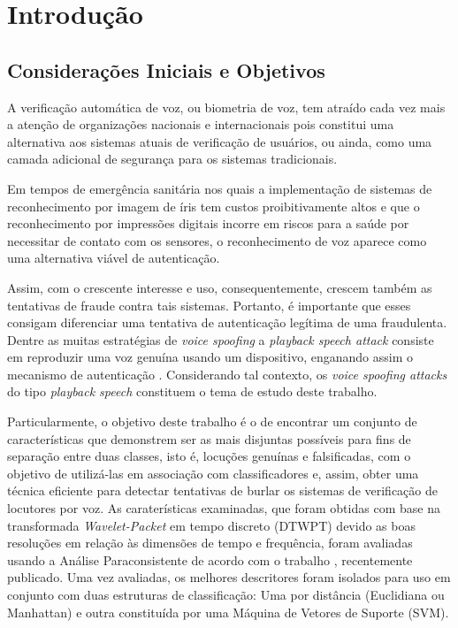 \chapter{Introdução}
	\section{Considerações Iniciais e Objetivos}
		\par A verificação automática de voz, ou biometria de voz, tem atraído cada vez mais a atenção de organizações nacionais e internacionais pois constitui uma alternativa aos sistemas atuais de verificação de usuários, ou ainda, como uma camada adicional de segurança para os sistemas tradicionais. 
		
		\par Em tempos de emergência sanitária nos quais a implementação de sistemas de reconhecimento por imagem de íris tem custos proibitivamente altos e que o reconhecimento por impressões digitais incorre em riscos para a saúde por necessitar de contato com os sensores, o reconhecimento de voz aparece como uma alternativa viável de autenticação.		
		
		\par Assim, com o crescente interesse e uso, consequentemente, crescem também as tentativas de fraude contra tais sistemas. Portanto, é importante que esses consigam diferenciar uma tentativa de autenticação legítima de uma fraudulenta. Dentre as muitas estratégias de \textit{voice spoofing} a \textit{playback speech attack} consiste em reproduzir uma voz genuína usando um dispositivo, enganando assim o mecanismo de autenticação \cite{vs2}\cite{dsp3}\cite{dsp4}. Considerando tal contexto, os \textit{voice spoofing attacks} do tipo \textit{playback speech} constituem o tema de estudo deste trabalho. 

		\par Particularmente, o objetivo deste trabalho é o de encontrar um conjunto de características que demonstrem ser as mais disjuntas possíveis para fins de separação entre duas classes, isto é, locuções genuínas e falsificadas, com o objetivo de utilizá-las em associação com classificadores e, assim, obter uma técnica eficiente para detectar tentativas de burlar os sistemas de verificação de locutores por voz. As caraterísticas examinadas, que foram obtidas com base na transformada \textit{Wavelet-Packet} em tempo discreto (DTWPT) devido as boas resoluções em relação às dimensões de tempo e frequência, foram avaliadas usando a Análise Paraconsistente de acordo com o trabalho \cite{8588433}, recentemente publicado. Uma vez avaliadas, os melhores descritores foram isolados para uso em conjunto com duas estruturas de classificação: Uma por distância (Euclidiana ou Manhattan) e outra constituída por uma Máquina de Vetores de Suporte (SVM). 
		
